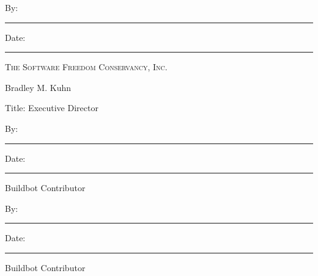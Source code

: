 \documentclass[letterpaper,12pt]{article}
\begin{document}
\vspace{3em}


By: \hspace{0.95em}\rule{0.50\textwidth}{0.2mm} \hfill{}Date: \rule{0.25\textwidth}{0.2mm}

\hspace{2.5em} \textsc{The Software Freedom Conservancy, Inc. }

\hspace{2.5em} Bradley M. Kuhn

\hspace{2.5em} Title: Executive Director \\[6ex]

\vspace{2ex}


By: \hspace{0.95em}\rule{0.50\textwidth}{0.2mm} \hfill{}Date: \rule{0.25\textwidth}{0.2mm}

\hspace{2.5em} Buildbot Contributor

\vspace{2ex}


By: \hspace{0.95em}\rule{0.50\textwidth}{0.2mm} \hfill{}Date: \rule{0.25\textwidth}{0.2mm}

\hspace{2.5em} Buildbot Contributor
\end{document}
